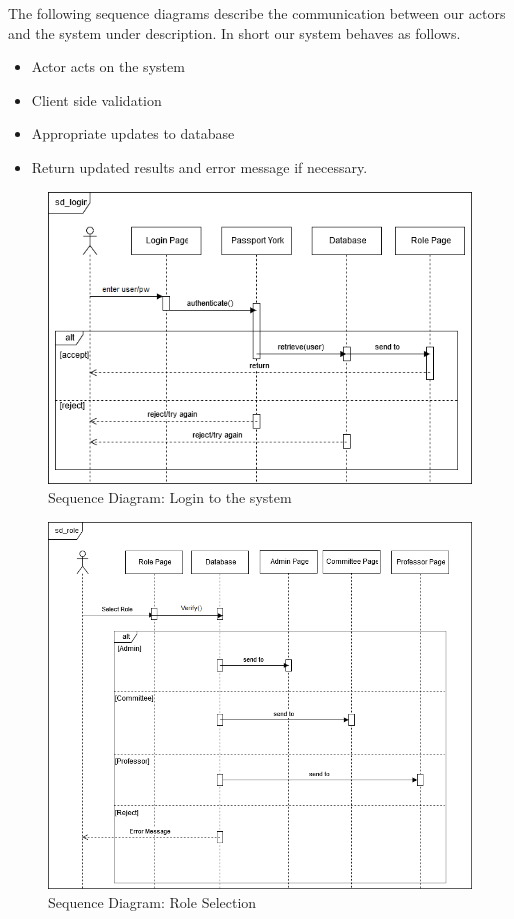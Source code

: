 \documentclass[fontsize=12pt,paper=letter,twoside]{scrartcl}
\begin{document}
The following sequence diagrams describe the communication between our actors and the system under description. In short our system behaves as follows.

\begin{itemize}
\item Actor acts on the system
\item Client side validation
\item Appropriate updates to database
\item Return updated results and error message if necessary.
\end{itemize}

\begin{figure}[!htb]
\begin{center}
\includegraphics[width=.99\textwidth]{images/sd_login.png}
\end{center}
\caption{Sequence Diagram: Login to the system}
\label{fig:sd_login}
\end{figure}

\begin{figure}[!htb]
\begin{center}
\includegraphics[width=.99\textwidth]{images/sd_role.png}
\end{center}
\caption{Sequence Diagram: Role Selection}
\label{fig:sd_role_selection}
\end{figure}
\end{document}
